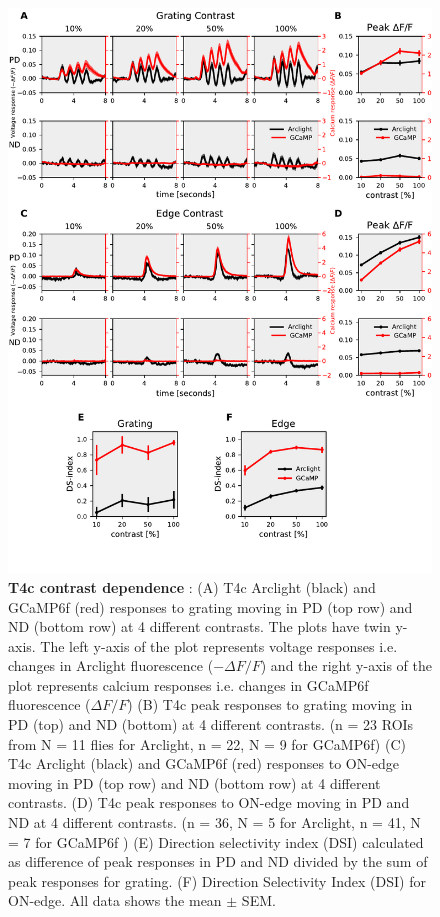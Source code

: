 \documentclass[9pt,lineno]{elife}
\begin{document}
\begin{figure}
\begin{fullwidth}
\includegraphics[width=0.84\linewidth]{figure2}
\caption{\textbf{T4c contrast dependence} : (A) T4c Arclight (black) and GCaMP6f (red) responses to grating moving in PD (top row) and ND (bottom row) at 4 different contrasts. The plots have twin y-axis. The left y-axis of the plot represents voltage responses i.e. changes in Arclight fluorescence ($-\Delta F/F$) and the right y-axis of the plot represents calcium responses i.e. changes in GCaMP6f fluorescence ($\Delta F/F$) (B) T4c peak responses to grating moving in PD (top) and ND (bottom) at 4 different contrasts. (n = 23 ROIs from N = 11 flies for Arclight, n = 22, N = 9 for GCaMP6f) (C) T4c Arclight (black) and GCaMP6f (red) responses to ON-edge moving in PD (top row) and ND (bottom row) at 4 different contrasts. (D) T4c peak responses to ON-edge moving in PD and ND at 4 different contrasts. (n = 36, N = 5 for Arclight, n = 41, N = 7 for GCaMP6f ) (E) Direction selectivity index (DSI) calculated as difference of peak responses in PD and ND divided by the sum of peak responses for grating. (F) Direction Selectivity Index (DSI) for ON-edge. All data shows the mean $\pm$ SEM.}

\label{PDNDcontrast}
	
\end{fullwidth}
\end{figure} 
\end{document}
